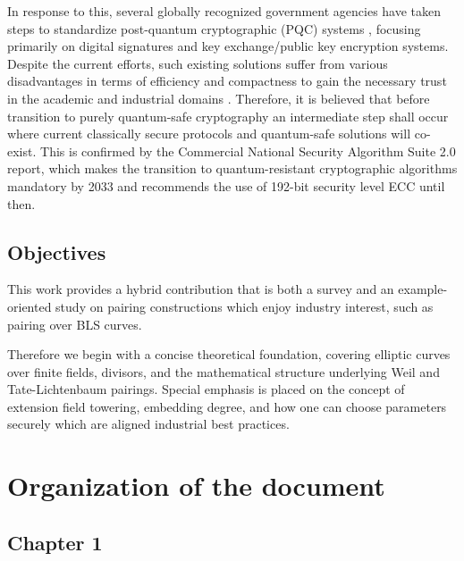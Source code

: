 In response to this, several globally recognized government agencies have taken steps to standardize post-quantum  cryptographic (PQC) systems , focusing primarily on digital signatures and key exchange/public key encryption systems.
Despite the current efforts, such existing solutions suffer from various disadvantages in terms of efficiency and compactness to gain the necessary trust in the academic and industrial domains \cite{AranhaFotiadisGuillevic2024}.  Therefore, it is believed that before transition to purely quantum-safe cryptography an intermediate step shall occur where current classically secure protocols and quantum-safe solutions will co-exist.\cite{AranhaFotiadisGuillevic2024} This is confirmed by the Commercial National Security Algorithm Suite 2.0 report\cite{nsa2022cnsa2}, which  makes the transition to quantum-resistant cryptographic algorithms mandatory by 2033 and recommends the use of 192-bit security level ECC until then.\cite{AranhaFotiadisGuillevic2024, nsa2022cnsa2}

\subsection{Objectives}
\label{ssec:ch00.objectives}

This work provides a hybrid contribution that is both a survey and an example-oriented study on pairing constructions which enjoy industry interest, such as pairing over BLS curves.\cite{ecc.pairing.curves.bls,AranhaFotiadisGuillevic2024}


Therefore we begin with a concise theoretical foundation, covering elliptic curves over finite fields, divisors, and the mathematical structure underlying Weil and Tate-Lichtenbaum pairings. Special emphasis is placed on the concept of extension field towering, embedding degree, and how one can choose parameters securely which are aligned industrial best practices. \cite{theory.pairings.for.beginners, Washington2008ECC, costello.fast.formulas.thesis}

\section{Organization of the document}
\label{ssec:ch00.organizationofdocument}

\subsection*{Chapter 1}

